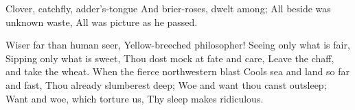 \begin{poem}
\begin{stanza}
			Clover, catchfly, adder's-tongue\verseline
			And brier-roses, dwelt among;\verseline
			All beside was unknown waste,\verseline
			All was picture as he passed.
	\end{stanza}
	\begin{stanza}
			Wiser far than human seer,\verseline
			Yellow-breeched philosopher!\verseline
			Seeing only what is fair,\verseline
			Sipping only what is sweet,\verseline
			Thou dost mock at fate and care,\verseline
			Leave the chaff, and take the wheat.\verseline
			When the fierce northwestern blast\verseline
			Cools sea and land so far and fast,\verseline
			Thou already slumberest deep;\verseline
			Woe and want thou canst outsleep;\verseline
			Want and woe, which torture us,\verseline
			Thy sleep makes ridiculous.
	\end{stanza}
\end{poem}
